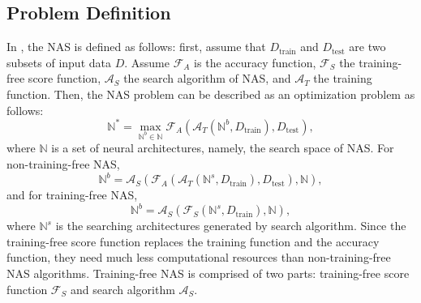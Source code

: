 \documentclass[sigconf]{acmart}
\begin{document}
    \subsection{Problem Definition}
    In \cite{10092788}, the NAS is defined as follows: 
    first, assume that $D_{\text{train}}$ and $D_{\text{test}}$ are two subsets of input data $D$. 
    Assume $\mathcal F_A$ is the accuracy function, $\mathcal F_S$ the training-free score function, $\mathcal A_S$ the 
    search algorithm of NAS, and $\mathcal A_T$ the training function. Then, the NAS problem can be 
    described as an optimization problem as follows: 
    \begin{equation}
        \label{equ:nas}
        \mathbb N^*=\max_{\mathbb N^b\in\mathbb N}\mathcal F_A(\mathcal A_T(\mathbb N^b, D_{\text{train}}), D_{\text{test}}),
    \end{equation}
    where $\mathbb N$ is a set of neural architectures, namely, the search space of NAS. 
    For non-training-free NAS, 
    \begin{equation}
        \label{equ:non-training_free_nas}
        \mathbb N^b=\mathcal A_S(\mathcal F_A(\mathcal A_T(\mathbb N^s, D_{\text{train}}), D_{\text{test}}), \mathbb N),  
    \end{equation}
    and for training-free NAS, 
    \begin{equation}
        \label{equ:training_free_nas}
        \mathbb N^b=\mathcal A_S(\mathcal F_S(\mathbb N^s, D_{\text{train}}), \mathbb N),
    \end{equation}
    where $\mathbb N^s$ is the searching architectures generated by search algorithm. 
    Since the training-free score function replaces the training function and the accuracy 
    function, they need much less computational resources than non-training-free NAS algorithms. 
    Training-free NAS is comprised of two parts: training-free score function $\mathcal F_S$ and 
    search algorithm $\mathcal A_S$. 
\end{document}
